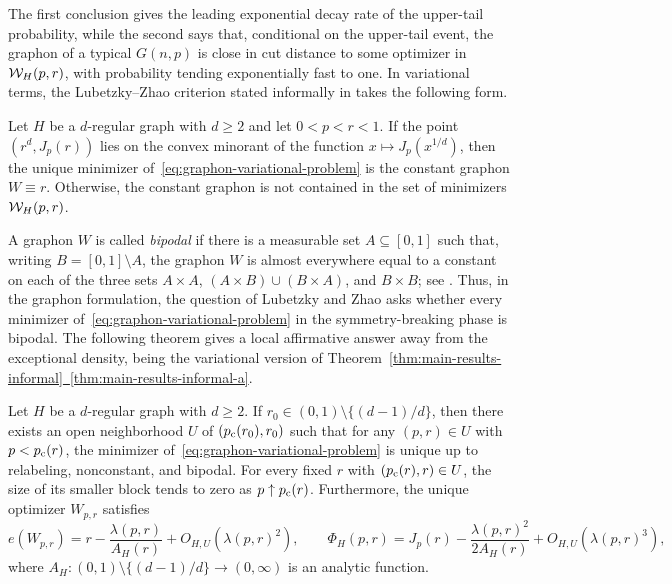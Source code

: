 The first conclusion gives the leading exponential decay rate of the
upper-tail probability, while the second says that, conditional on the
upper-tail event, the graphon of a typical $G(n,p)$ is close in cut distance
to some optimizer in $\mathcal W_H(p,r)$, with probability tending exponentially fast
to one.  In variational terms, the Lubetzky--Zhao criterion stated informally in
 takes the following form.
\begin{theorem}\label{thm:lz-criterion}
    Let $H$ be a $d$-regular graph with $d\ge2$ and let $0<p<r<1$.
    If the point $(r^d, J_p(r))$ lies on the convex minorant of the function $x\mapsto J_p(x^{1/d})$, then the unique minimizer of~\eqref{eq:graphon-variational-problem} is the constant graphon $W\equiv r$. Otherwise, the constant graphon is not contained in the set of minimizers $\mathcal W_H(p, r)$.
\end{theorem}
A graphon $W$ is called \emph{bipodal} if there is a measurable set $A\subseteq[0,1]$ such that, writing $B=[0,1]\setminus A$, the graphon $W$ is almost everywhere equal to a constant on each of the three sets $A\times A$, $(A\times B)\cup(B\times A)$, and $B\times B$; see .
Thus, in the graphon formulation, the question of Lubetzky and Zhao asks
whether every minimizer of~\eqref{eq:graphon-variational-problem} in the
symmetry-breaking phase is bipodal.  The following theorem gives a local
affirmative answer away from the exceptional density, being the variational version of
Theorem~\hyperref[thm:main-results-informal-a]{\ref*{thm:main-results-informal}~\ref*{thm:main-results-informal-a}}.

\begin{theorem}\label{thm:nonexceptional-optimizers}
    Let $H$ be a $d$-regular graph with $d\ge2$.
    If $r_0 \in (0, 1)\setminus\{(d-1)/d\}$, then there exists
    an open neighborhood $U$ of $(p_{\mathrm c}(r_0), r_0)$ such that for
    any $(p, r)\in U$ with $p<p_{\mathrm c}(r)$, the minimizer of~\eqref{eq:graphon-variational-problem}
    is unique up to relabeling, nonconstant, and bipodal.
    For every fixed $r$ with $(p_{\mathrm c}(r),r)\in U$, the size of its smaller
    block tends to zero as $p\uparrow p_{\mathrm c}(r)$.
    Furthermore, the unique optimizer $W_{p, r}$ satisfies
      \[
    e(W_{p,r})=r-\frac{\lambda(p,r)}{A_H(r)}+O_{H,U}(\lambda(p,r)^2),
    \qquad
    \Phi_H(p,r)=J_p(r)-\frac{\lambda(p,r)^2}{2A_H(r)}
      +O_{H,U}(\lambda(p,r)^3),
  \]
    where $A_H:(0,1) \setminus\{(d-1)/d\} \to (0, \infty)$ is an analytic function.
\end{theorem}

